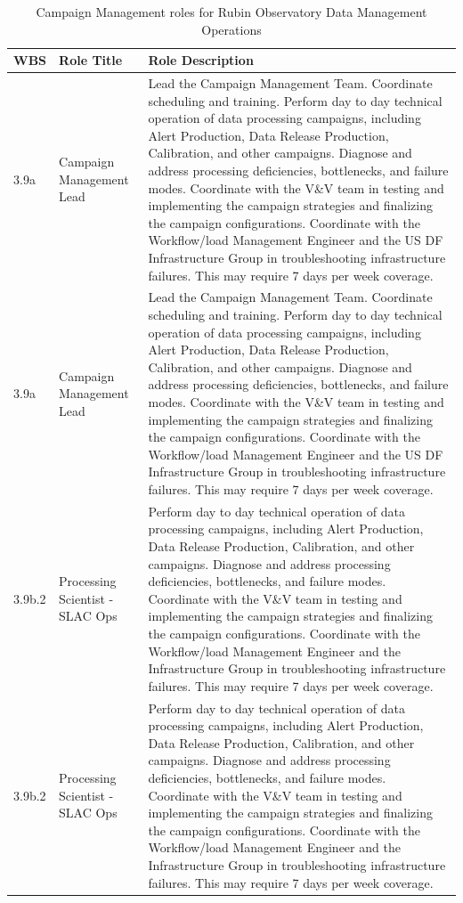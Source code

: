 \normalsize \begin{longtable} {|p{}|p{}|p{}|} \caption{Campaign Management roles for Rubin Observatory Data Management Operations \label{tab:cmroles}}\\ 
\hline 
\textbf{WBS}&\textbf{Role Title}&\textbf{Role Description} \\ \hline
{3.9a}&{Campaign Management Lead}&{Lead the Campaign Management Team. Coordinate scheduling and training. Perform day to day technical operation of data processing campaigns, including Alert Production, Data Release Production, Calibration, and other campaigns. Diagnose and address processing deficiencies, bottlenecks, and failure modes. Coordinate with the V\&V team in testing and implementing the campaign strategies and finalizing the campaign configurations. Coordinate with the Workflow/load Management Engineer and the US DF Infrastructure Group in troubleshooting infrastructure failures. This may require 7 days per week coverage.} \\ \hline
{3.9a}&{Campaign Management Lead}&{Lead the Campaign Management Team. Coordinate scheduling and training. Perform day to day technical operation of data processing campaigns, including Alert Production, Data Release Production, Calibration, and other campaigns. Diagnose and address processing deficiencies, bottlenecks, and failure modes. Coordinate with the V\&V team in testing and implementing the campaign strategies and finalizing the campaign configurations. Coordinate with the Workflow/load Management Engineer and the US DF Infrastructure Group in troubleshooting infrastructure failures. This may require 7 days per week coverage.} \\ \hline
{3.9b.2}&{Processing Scientist - SLAC Ops}&{Perform day to day technical operation of data processing campaigns, including Alert Production, Data Release Production, Calibration, and other campaigns. Diagnose and address processing deficiencies, bottlenecks, and failure modes. Coordinate with the V\&V team in testing and implementing the campaign strategies and finalizing the campaign configurations. Coordinate with the Workflow/load Management Engineer and the Infrastructure Group in troubleshooting infrastructure failures. This may require 7 days per week coverage.} \\ \hline
{3.9b.2}&{Processing Scientist - SLAC Ops}&{Perform day to day technical operation of data processing campaigns, including Alert Production, Data Release Production, Calibration, and other campaigns. Diagnose and address processing deficiencies, bottlenecks, and failure modes. Coordinate with the V\&V team in testing and implementing the campaign strategies and finalizing the campaign configurations. Coordinate with the Workflow/load Management Engineer and the Infrastructure Group in troubleshooting infrastructure failures. This may require 7 days per week coverage.} \\ \hline

\end{longtable}
